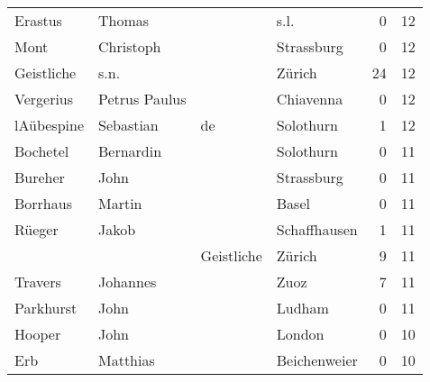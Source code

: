 \begin{center}
\begin{tiny}
\begin{longtabu}{llllrr}
                  Erastus &                             Thomas &             &                                        s.l. &          0 &        12 \\
                     Mont &                          Christoph &             &                                  Strassburg &          0 &        12 \\
               Geistliche &                               s.n. &             &                                      Zürich &         24 &        12 \\
                Vergerius &                      Petrus Paulus &             &                                   Chiavenna &          0 &        12 \\
               lAübespine &                          Sebastian &          de &                                   Solothurn &          1 &        12 \\
                 Bochetel &                          Bernardin &             &                                   Solothurn &          0 &        11 \\
                  Bureher &                               John &             &                                  Strassburg &          0 &        11 \\
                 Borrhaus &                             Martin &             &                                       Basel &          0 &        11 \\
                   Rüeger &                              Jakob &             &                                Schaffhausen &          1 &        11 \\
                          &                                    &  Geistliche &                                      Zürich &          9 &        11 \\
                  Travers &                           Johannes &             &                                        Zuoz &          7 &        11 \\
                Parkhurst &                               John &             &                                      Ludham &          0 &        11 \\
                   Hooper &                               John &             &                                      London &          0 &        10 \\
                      Erb &                           Matthias &             &                                Beichenweier &          0 &        10 \\

\end{longtabu}
\end{tiny}
\end{center}
